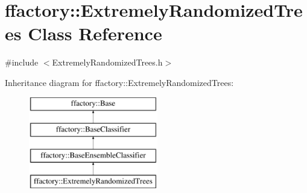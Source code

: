 \hypertarget{classffactory_1_1_extremely_randomized_trees}{\section{ffactory\-:\-:Extremely\-Randomized\-Trees Class Reference}
\label{classffactory_1_1_extremely_randomized_trees}
}


{\ttfamily \#include $<$Extremely\-Randomized\-Trees.\-h$>$}

Inheritance diagram for ffactory\-:\-:Extremely\-Randomized\-Trees\-:\begin{figure}[H]
\begin{center}
\leavevmode
\includegraphics[height=4.000000cm]{classffactory_1_1_extremely_randomized_trees}
\end{center}
\end{figure}

